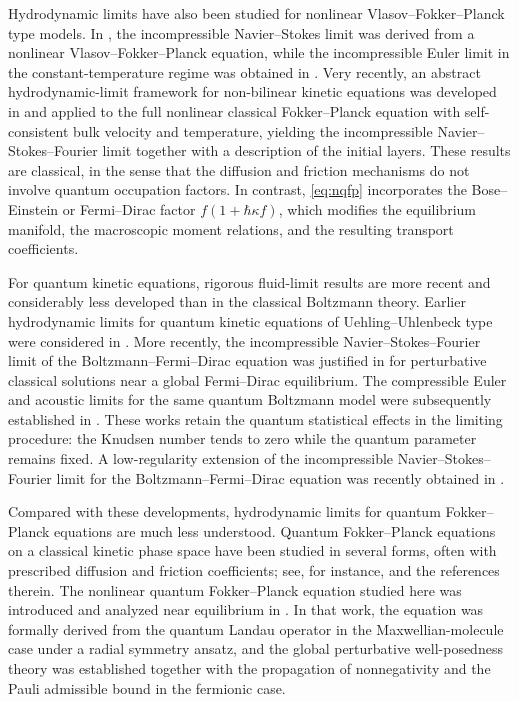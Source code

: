 \documentclass[10pt,reqno]{amsart}
\numberwithin{equation}{section}
\begin{document}
Hydrodynamic limits have also been studied for nonlinear Vlasov--Fokker--Planck type models. In \cite{CJ24}, the incompressible Navier--Stokes limit was derived from a nonlinear Vlasov--Fokker--Planck equation, while the incompressible Euler limit in the constant-temperature regime was obtained in \cite{CJ26}.   Very
recently, an abstract hydrodynamic-limit framework for non-bilinear kinetic equations was developed in \cite{Ger26} and applied to the full nonlinear classical Fokker--Planck equation with self-consistent bulk velocity and temperature, yielding the incompressible Navier--Stokes--Fourier limit together with a description of the initial
layers. These results are classical, in the sense that the diffusion and friction mechanisms do not involve quantum occupation factors. In contrast, \eqref{eq:nqfp} incorporates the Bose--Einstein or Fermi--Dirac factor $f(1+\hbar\kappa f)$, which modifies the equilibrium manifold, the macroscopic moment relations, and the resulting transport coefficients.

For quantum kinetic equations, rigorous fluid-limit results are more recent and considerably less developed than in the classical Boltzmann theory. Earlier hydrodynamic limits for quantum kinetic equations of Uehling--Uhlenbeck type were considered in \cite{AL97}. More recently, the incompressible Navier--Stokes--Fourier limit of the Boltzmann--Fermi--Dirac equation was justified in \cite{JXZ22} for perturbative classical solutions near a global Fermi--Dirac equilibrium. The compressible Euler and acoustic limits for the same quantum Boltzmann model were subsequently established in \cite{JZ24}. These works retain the quantum statistical effects in the limiting procedure: the Knudsen number tends to zero while the quantum parameter remains fixed. A low-regularity extension of the incompressible Navier--Stokes--Fourier limit for the Boltzmann--Fermi--Dirac equation was recently obtained in \cite{JWZ26}.

Compared with these developments, hydrodynamic limits for quantum Fokker--Planck equations are much less understood. Quantum Fokker--Planck equations on a classical kinetic phase space have been studied in several forms, often with prescribed diffusion and friction coefficients; see, for instance, \cite{NS07,LZ15} and the references therein. The nonlinear quantum Fokker--Planck equation studied here was introduced and analyzed near equilibrium in \cite{CHHpre}. In that work, the equation was formally derived from the quantum Landau operator in the Maxwellian-molecule case under a radial symmetry ansatz, and the global perturbative well-posedness theory was established together with the propagation of nonnegativity and the Pauli admissible bound in the fermionic case.
\end{document}
